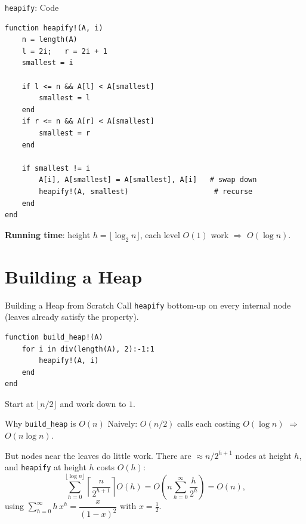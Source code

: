 \documentclass[10pt,aspectratio=169]{beamer}
\begin{document}
\begin{frame}[fragile]{\texttt{heapify}: Code}
\begin{lstlisting}
function heapify!(A, i)
    n = length(A)
    l = 2i;   r = 2i + 1
    smallest = i

    if l <= n && A[l] < A[smallest]
        smallest = l
    end
    if r <= n && A[r] < A[smallest]
        smallest = r
    end

    if smallest != i
        A[i], A[smallest] = A[smallest], A[i]   # swap down
        heapify!(A, smallest)                    # recurse
    end
end
\end{lstlisting}

  \bigskip
  \textbf{Running time}: height $h = \lfloor \log_2 n \rfloor$,
  each level $O(1)$ work $\Rightarrow$ $O(\log n)$.
\end{frame}

\section{Building a Heap}

\begin{frame}[fragile]{Building a Heap from Scratch}
  Call \texttt{heapify} bottom-up on every \alert{internal} node
  (leaves already satisfy the property).

\begin{lstlisting}
function build_heap!(A)
    for i in div(length(A), 2):-1:1
        heapify!(A, i)
    end
end
\end{lstlisting}

  \bigskip
  \begin{center}
    Start at $\lfloor n/2 \rfloor$ and work down to $1$.
  \end{center}
\end{frame}

\begin{frame}{Why \texttt{build\_heap} is $O(n)$}
  Naively: $O(n/2)$ calls each costing $O(\log n)$ $\Rightarrow$ $O(n \log n)$.

  \bigskip
  But nodes near the leaves do \alert{little work}.
  There are $\approx n/2^{h+1}$ nodes at height $h$, and \texttt{heapify}
  at height $h$ costs $O(h)$:
  \[
    \sum_{h=0}^{\lfloor \log n \rfloor}
    \left\lceil \frac{n}{2^{h+1}} \right\rceil O(h)
    = O\!\left(n \sum_{h=0}^{\infty} \frac{h}{2^h}\right) = O(n),
  \]
  using $\displaystyle\sum_{h=0}^{\infty} h\,x^h = \dfrac{x}{(1-x)^2}$ with $x = \tfrac{1}{2}$.
\end{frame}
\end{document}
